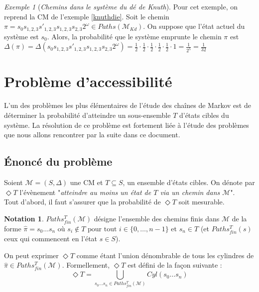 \documentclass[12pt,a4paper]{report}
\theoremstyle{definition}%
\newtheorem*{notation}{Notation}
\theoremstyle{remark}
\newtheorem{example}{Exemple}[chapter]
\begin{document}
\begin{example}[\textit{Chemins dans le système du dé de Knuth}]
	Pour cet exemple, on reprend la CM de l'exemple \ref{knuthdie}. Soit le chemin $\pi = s_0 s_{1,2,3} s'_{1, 2, 3} s_{1,2,3} s_{2,3} 2^\omega \in Paths(\mathcal{M}_{Kd})$.
	On suppose que l'état actuel du système est $s_0$. Alors, la probabilité que le système emprunte le chemin $\pi$ est $\Delta(\pi) = \Delta(s_0 s_{1,2,3} s'_{1, 2, 3} s_{1,2,3} s_{2,3} 2^\omega) = \frac{1}{2} \cdot \frac{1}{2} \cdot \frac{1}{2} \cdot \frac{1}{2} \cdot \frac{1}{2} \cdot 1 = \frac{1}{2^5} = \frac{1}{32}$
\end{example}

\section{Problème d'accessibilité} \label{accCM}

L'un des problèmes les plus élémentaires de l'étude des chaînes de Markov est de déterminer la probabilité d'atteindre un sous-ensemble $T$ d'états cibles du système. La résolution de ce problème est fortement liée à l'étude des problèmes que nous allons rencontrer par la suite dans ce document.

\subsection{\'Enoncé du problème}
Soient $\mathcal{M} = (S, \Delta)$ une CM et $T \subseteq S$, un ensemble d'états cibles. On dénote par $\Diamond T$ l'évènement "\textit{atteindre au moins un état de $T$ via un chemin dans $\mathcal{M}$}". \\
Tout d'abord, il faut s'assurer que la probabilité de $\Diamond T$ soit mesurable.
\begin{notation} $Paths_{fin}^T(\mathcal{M})$ désigne l'ensemble des chemins finis dans $\mathcal{M}$ de la forme $\hat{\pi} = s_0 \dots s_n$ où $s_i \notin T \text{ pour tout } i \in \{0, \dots, n-1\}$ et $s_n \in T$ (et $Paths_{fin}^T(s)$ ceux qui commencent en l'état $s \in S$).
\end{notation}
On peut exprimer $\Diamond T$ comme étant l'union dénombrable de tous les cylindres de $\hat{\pi} \in Paths_{fin}^T(\mathcal{M})$. Formellement, $\Diamond T$ est défini de la façon suivante :
\[
	\Diamond T = \bigcup_{s_0 \dots s_n \in Paths_{fin}^T(\mathcal{M})} Cyl(s_0 \dots s_n)
\]
\end{document}
